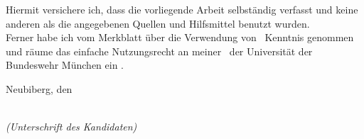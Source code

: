 \newpage

\thispagestyle{empty}

\begin{large}

\vspace*{2cm}

\noindent
Hiermit versichere ich, dass die vorliegende Arbeit selbständig verfasst und keine anderen als die angegebenen Quellen und Hilfsmittel benutzt wurden.\\[1em]

\noindent
Ferner habe ich vom Merkblatt über die Verwendung von \Darbeit \ Kenntnis genommen und räume das einfache Nutzungsrecht an meiner \Darbeit \ der Universität der Bundeswehr München %
ein%
.

\vspace{2cm}

\noindent
Neubiberg, den \Dday

\vspace{3cm}

\hspace*{7cm}%
\dotfill\\
\hspace*{8.5cm}%
\textit{(Unterschrift des Kandidaten)}

\end{large}
